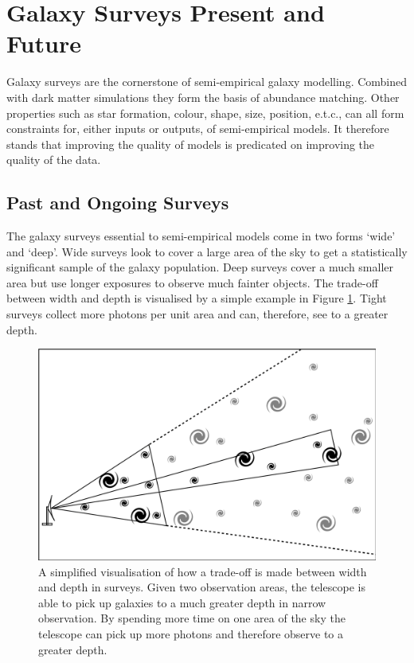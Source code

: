 \section{Galaxy Surveys Present and Future}
\label{sec:Surveys}
Galaxy surveys are the cornerstone of semi-empirical galaxy modelling. Combined with dark matter simulations they form the basis of abundance matching. Other properties such as star formation, colour, shape, size, position, e.t.c., can all form constraints for, either inputs or outputs, of semi-empirical models. It therefore stands that improving the quality of models is predicated on improving the quality of the data.

\subsection{Past and Ongoing Surveys}
The galaxy surveys essential to semi-empirical models come in two forms `wide' and `deep'. Wide surveys look to cover a large area of the sky to get a statistically significant sample of the galaxy population. Deep surveys cover a much smaller area but use longer exposures to observe much fainter objects. The trade-off between width and depth is visualised by a simple example in Figure \ref{fig:WvD}. Tight surveys collect more photons per unit area and can, therefore, see to a greater depth.

\begin{figure}[h]
    \centering
    \includegraphics[width = \linewidth]{Figures/Chapter1/W_v_D_Toon.png}
    \caption{A simplified visualisation of how a trade-off is made between width and depth in surveys. Given two observation areas, the telescope is able to pick up galaxies to a much greater depth in narrow observation. By spending more time on one area of the sky the telescope can pick up more photons and therefore observe to a greater depth.}
    \label{fig:WvD}
\end{figure}

